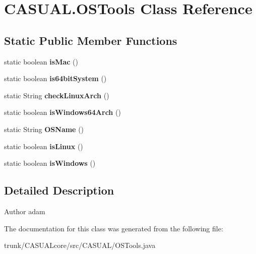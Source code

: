 \hypertarget{classCASUAL_1_1OSTools}{\section{C\-A\-S\-U\-A\-L.\-O\-S\-Tools Class Reference}
\label{classCASUAL_1_1OSTools}
}
\subsection*{Static Public Member Functions}
\begin{DoxyCompactItemize}
\item 
\hypertarget{classCASUAL_1_1OSTools_a0e56ffe8c5d4bb116822b580bc446f88}{static boolean {\bfseries is\-Mac} ()}\label{classCASUAL_1_1OSTools_a0e56ffe8c5d4bb116822b580bc446f88}

\item 
\hypertarget{classCASUAL_1_1OSTools_a8068ad9e8a1c65f19983881b0e0b24a1}{static boolean {\bfseries is64bit\-System} ()}\label{classCASUAL_1_1OSTools_a8068ad9e8a1c65f19983881b0e0b24a1}

\item 
\hypertarget{classCASUAL_1_1OSTools_aec6bfc5a30c3575087ed4f01fe097224}{static String {\bfseries check\-Linux\-Arch} ()}\label{classCASUAL_1_1OSTools_aec6bfc5a30c3575087ed4f01fe097224}

\item 
\hypertarget{classCASUAL_1_1OSTools_aba47c5eb8808b1068b08e95879dd3398}{static boolean {\bfseries is\-Windows64\-Arch} ()}\label{classCASUAL_1_1OSTools_aba47c5eb8808b1068b08e95879dd3398}

\item 
\hypertarget{classCASUAL_1_1OSTools_a30268489d47f25c2bf74fc081e2f059a}{static String {\bfseries O\-S\-Name} ()}\label{classCASUAL_1_1OSTools_a30268489d47f25c2bf74fc081e2f059a}

\item 
\hypertarget{classCASUAL_1_1OSTools_a41ba4fa3af5e04583de46598a9d39e73}{static boolean {\bfseries is\-Linux} ()}\label{classCASUAL_1_1OSTools_a41ba4fa3af5e04583de46598a9d39e73}

\item 
\hypertarget{classCASUAL_1_1OSTools_ab0171f3f220d9e3bdbf131e0f0546e00}{static boolean {\bfseries is\-Windows} ()}\label{classCASUAL_1_1OSTools_ab0171f3f220d9e3bdbf131e0f0546e00}

\end{DoxyCompactItemize}


\subsection{Detailed Description}
\begin{DoxyAuthor}{Author}
adam 
\end{DoxyAuthor}


The documentation for this class was generated from the following file\-:\begin{DoxyCompactItemize}
\item 
trunk/\-C\-A\-S\-U\-A\-Lcore/src/\-C\-A\-S\-U\-A\-L/O\-S\-Tools.\-java\end{DoxyCompactItemize}
